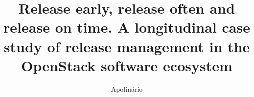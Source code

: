 \documentclass[dvipsnames]{bmcart}
\theoremstyle{definition}
\begin{document}
\begin{frontmatter}

\begin{fmbox}


\title{Release early, release often and release on time.  A longitudinal case study of  release management in the OpenStack software ecosystem}


\author[
   addressref={aff1},                   %
   corref={aff1},                       %
   email={jose.teixeira@abo.fi}   %
]{ Apolinário }

\author[
  addressref={aff1},  
   email={ekarsten@abo.fi}   %
]{ }




\address[id=aff1]{%
  , %
  ,                              %
}


\end{fmbox}
\end{frontmatter}
\end{document}
